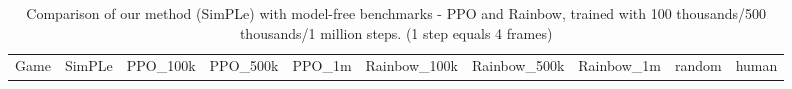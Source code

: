 \begin{landscape}
\begin{changemargin}{0cm}{0cm}
\begin{center}
\vspace*{\fill}
\setlength{\tabcolsep}{5pt}
\begin{table}[!htbp]
\scriptsize
\caption{Comparison of our method (SimPLe) with model-free benchmarks - PPO and Rainbow, trained with 100 thousands/500 thousands/1 million steps. (1 step equals 4 frames)}
\begin{tabular}{lrlrlrlrlrlrlrlcc}

Game &          \multicolumn{2}{c}{SimPLe}  &     \multicolumn{2}{c}{PPO\_100k}   &     \multicolumn{2}{c}{PPO\_500k} &     \multicolumn{2}{c}{PPO\_1m}   &     \multicolumn{2}{c}{Rainbow\_100k} &          \multicolumn{2}{c}{Rainbow\_500k}	&     \multicolumn{2}{c}{Rainbow\_1m} &		random &		human\\



\end{tabular}
\end{table}
\end{center}
\end{changemargin}
\end{landscape}
